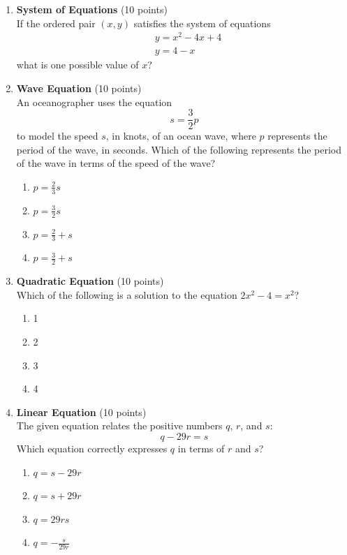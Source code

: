 \begin{enumerate}
  \item \textbf{System of Equations} (10 points)\\
  If the ordered pair $(x,y)$ satisfies the system of equations
  \[
    \begin{aligned}
      & y=x^{2}-4x+4 \\
      & y=4-x
    \end{aligned}
  \]
  what is one possible value of $x$?
  \begin{subanswer}
  \end{subanswer}

  \newpage

  \item \textbf{Wave Equation} (10 points)\\
  An oceanographer uses the equation $$s=\frac{3}{2}p$$ to model the speed $s$, in knots, of an ocean wave, where $p$ represents the period of the wave, in seconds. Which of the following represents the period of the wave in terms of the speed of the wave?
  \begin{enumerate}[label=(\Alph*)]
    \item $p=\frac{2}{3}s$
    \item $p=\frac{3}{2}s$
    \item $p=\frac{2}{3}+s$
    \item $p=\frac{3}{2}+s$
  \end{enumerate}
  \begin{subanswer}
  \end{subanswer}

  \item \textbf{Quadratic Equation} (10 points)\\
  Which of the following is a solution to the equation $2x^{2}-4=x^{2}$?
  \begin{enumerate}[label=(\Alph*)]
    \item 1
    \item 2
    \item 3
    \item 4
  \end{enumerate}
  \begin{subanswer}
  \end{subanswer}

  \item \textbf{Linear Equation} (10 points)\\
  The given equation relates the positive numbers $q$, $r$, and $s$:
  \[
    q-29r=s
  \]
  Which equation correctly expresses $q$ in terms of $r$ and $s$?
  \begin{enumerate}[label=(\Alph*)]
    \item $q=s-29r$
    \item $q=s+29r$
    \item $q=29rs$
    \item $q=-\frac{s}{29r}$
  \end{enumerate}
  \begin{subanswer}
  \end{subanswer}


\end{enumerate}
